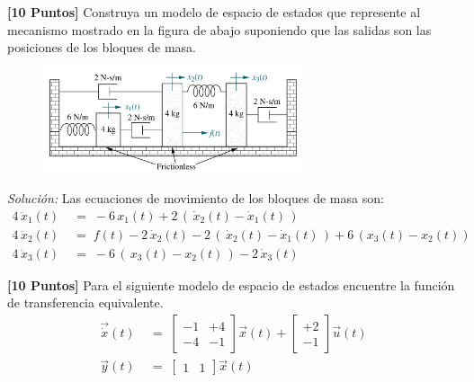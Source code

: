 \documentclass[ a4paper, twoside, 11pt]{article}
\begin{document}
\begin{problem} \textbf{[10 Puntos]} Construya un modelo de espacio de estados que represente al mecanismo mostrado en la figura de abajo suponiendo que las salidas son las posiciones de los bloques de masa. 

\begin{figure}[htb]
\centering
\includegraphics[width=0.68\textwidth]{prob_espacio-estados.jpg}
\end{figure}

\emph{Soluci\'on:} Las ecuaciones de movimiento de los bloques de masa son: 
\begin{align*}
4 \, \ddot{x}_1(t) \;
& = \; -6 \, x_1(t) + 2 \, ( \, \dot{x}_2(t) - \dot{x}_1(t) \, ) \\
4 \, \ddot{x}_2(t) \;
& = \; f(t) -2 \, \dot{x}_2(t) - 2 \, ( \, \dot{x}_2(t) - \dot{x}_1(t) \, ) + 6 \, ( x_3(t) - x_2(t) ) \\
4 \, \ddot{x}_3(t) \;
& = \; -6 \, ( \, x_3(t) - x_2(t) \, ) - 2 \, \dot{x}_3(t)
\end{align*}

\end{problem}
\vspace{\baselineskip}

\begin{problem}
\textbf{[10 Puntos]} Para el siguiente modelo de espacio de estados encuentre la funci\'on de transferencia equivalente. 
\begin{align*}
\vec{\dot{x}}(t) \; & = \; 
\left[ \begin{array}{cc}
-1 & +4 \\ -4 & -1
\end{array} \right] \vec{x}(t) + 
\left[ \begin{array}{c}
+2 \\ -1
\end{array} \right] \vec{u}(t) \\[2ex]
\vec{y}(t) \; & = \; 
\left[ \begin{array}{cc}
1 & 1
\end{array} \right] \vec{x}(t)
\end{align*}

\end{problem}
\vspace{\baselineskip}
\end{document}
